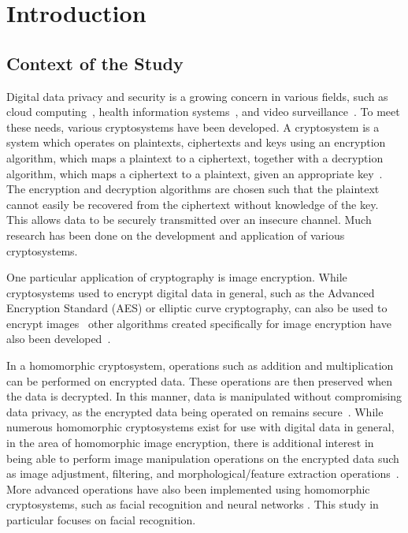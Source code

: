 \section{Introduction}
\subsection{Context of the Study}
Digital data privacy and security is a growing concern in various fields, such as cloud computing~\cite{potey_homomorphic_2016}, health information systems~\cite{kester_cryptographic_2015}, and video surveillance~\cite{upmanyu_efficient_2009}. To meet these needs, various cryptosystems have been developed. A cryptosystem is a system which operates on plaintexts, ciphertexts and keys using an encryption algorithm, which maps a plaintext to a ciphertext, together with a decryption algorithm, which maps a ciphertext to a plaintext, given an appropriate key~\cite{bauer_cryptosystem_2005}. The encryption and decryption algorithms are chosen such that the plaintext cannot easily be recovered from the ciphertext without knowledge of the key. This allows data to be securely transmitted over an insecure channel. Much research has been done on the development and application of various cryptosystems.

One particular application of cryptography is image encryption. While cryptosystems used to encrypt digital data in general, such as the Advanced Encryption Standard (AES) or elliptic curve cryptography, can also be used to encrypt images~\cite{jain_image_2016, singh_image_2015} other algorithms created specifically for image encryption have also been developed~\cite{murugan_survey_2018}.

In a homomorphic cryptosystem, operations such as addition and multiplication can be performed on encrypted data. These operations are then preserved when the data is decrypted. In this manner, data is manipulated without compromising data privacy, as the encrypted data being operated on remains secure~\cite{fontaine_survey_2007, sen_homomorphic_2013}. While numerous homomorphic cryptosystems exist for use with digital data in general, in the area of homomorphic image encryption, there is additional interest in being able to perform image manipulation operations on the encrypted data such as image adjustment, filtering, and morphological/feature extraction operations~\cite{ziad_cryptoimg:_2016, gonzalez_digital_2008}. More advanced operations have also been implemented using homomorphic cryptosystems, such as facial recognition \cite{hutchison_privacy-preserving_2009} and neural networks \cite{hesamifard_cryptodl:_2017}. This study in particular focuses on facial recognition.

